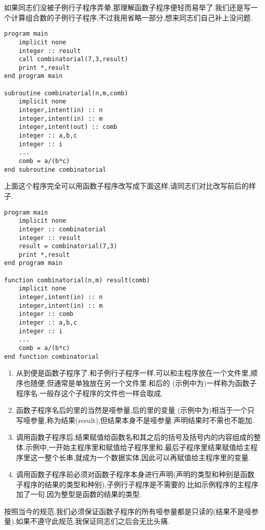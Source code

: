 如果同志们没被子例行子程序弄晕,那理解函数子程序便轻而易举了.我们还是写一个计算组合数的子例行子程序,不过我用省略一部分,想来同志们自己补上没问题.
\begin{lstlisting}
program main
    implicit none
    integer :: result
    call combinatorial(7,3,result)
    print *,result
end program main

subroutine combinatorial(n,m,comb)
    implicit none
    integer,intent(in) :: n
    integer,intent(in) :: m
    integer,intent(out) :: comb
    integer :: a,b,c
    integer :: i
    ...
    comb = a/(b*c)
end subroutine combinatorial
\end{lstlisting}
上面这个程序完全可以用函数子程序改写成下面这样,请同志们对比改写前后的样子.
\begin{lstlisting}
program main
    implicit none
    integer :: combinatorial
    integer :: result
    result = combinatorial(7,3)
    print *,result
end program main

function combinatorial(n,m) result(comb)
    implicit none
    integer,intent(in) :: n
    integer,intent(in) :: m
    integer :: comb
    integer :: a,b,c
    integer :: i
    ...
    comb = a/(b*c)
end function combinatorial
\end{lstlisting}
\begin{enumerate}
    \item 从到便是函数子程序了.和子例行子程序一样,可以和主程序放在一个文件里,顺序也随便,但通常是单独放在另一个文件里.和后的 (示例中为)一样称为函数子程序名.一般存这个子程序的文件也一样会取成.
    \item 函数子程序名后的\ttt{()}里的当然是哑参量,\ttt{()}后的里的变量 (示例中为)相当于一个只写哑参量,称为结果(result),但结果本身不是哑参量.声明结果时不需也不能加.
    \item 调用函数子程序后,结果赋值给函数名和其之后的括号及括号内的内容组成的整体.示例中,一开始主程序里和赋值给子程序里和,最后子程序里结果赋值给主程序里这一整个长串,就成为一个数据实体,因此可以再赋值给主程序里的变量.
    \item 调用函数子程序前必须对函数子程序本身进行声明(声明的类型和种别是函数子程序的结果的类型和种别),子例行子程序是不需要的.比如示例程序的主程序加了一句,因为整型是函数的结果的类型.
\end{enumerate}
按照当今的规范,我们必须保证函数子程序的所有哑参量都是只读的(结果不是哑参量).如果不遵守此规范,我保证同志们之后会无比头痛.

